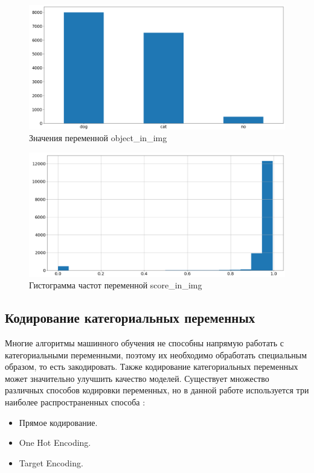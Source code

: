 \documentclass[14pt]{mmcs_article}
\begin{document}
\begin{figure}[H]
	\centering
	\includegraphics[scale=0.5]{objectimg.png}
	\caption{Значения переменной object\_in\_img}\label{analyse:objectimg}
\end{figure}

\begin{figure}[H]
	\centering
	\includegraphics[scale=0.5]{scoreimg.png}
	\caption{Гистограмма частот переменной score\_in\_img}\label{analyse:scoreimg}
\end{figure}



\subsection{Кодирование категориальных переменных}

Многие алгоритмы машинного обучения не способны напрямую работать с категориальными переменными, поэтому их необходимо обработать специальным образом, то есть закодировать. Также кодирование категориальных переменных может значительно улучшить качество моделей. Существует множество различных способов кодировки переменных, но в данной работе используется три наиболее распространенных способа \cite{lib:encode}:
\begin{itemize}
	\item Прямое кодирование.
	\item One Hot Encoding.
	\item Target Encoding.
\end{itemize}
\end{document}
